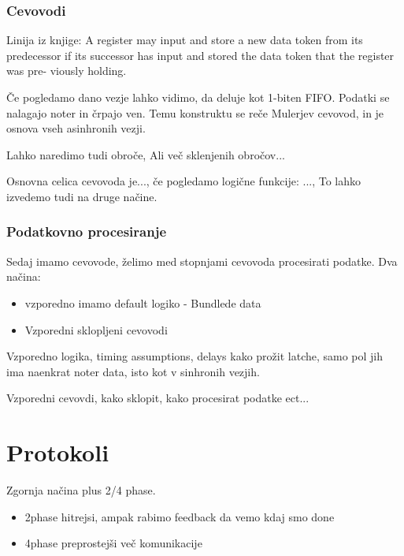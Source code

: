 \subsubsection{Cevovodi} \label{c}

Linija iz knjige:
A register may input and store a new data token from its predecessor if
its successor has input and stored the data token that the register was pre-
viously holding.

Če pogledamo dano vezje lahko vidimo, da deluje kot 1-biten FIFO. Podatki se nalagajo noter in črpajo ven. Temu konstruktu se reče Mulerjev cevovod, in je osnova vseh asinhronih vezji.

Lahko naredimo tudi obroče, Ali več sklenjenih obročov...

Osnovna celica cevovoda je..., če pogledamo logične funkcije: ..., To lahko izvedemo tudi na druge načine.

\subsubsection{Podatkovno procesiranje} \label{c}

Sedaj imamo cevovode, želimo med stopnjami cevovoda procesirati podatke. Dva načina:
\begin{itemize}
	\item vzporedno imamo default logiko - Bundlede data
	\item Vzporedni sklopljeni cevovodi
\end{itemize}
 
 Vzporedno logika, timing assumptions, delays kako prožit latche, samo pol jih ima naenkrat noter data, isto kot v sinhronih vezjih.
 
 Vzporedni cevovdi, kako sklopit, kako procesirat podatke ect...
 

%
%



\section{Protokoli} \label{a}
Zgornja načina plus 2/4 phase.
\begin{itemize}
	\item 2phase hitrejsi, ampak rabimo feedback da vemo kdaj smo done
	\item 4phase preprostejši več komunikacije
\end{itemize}

